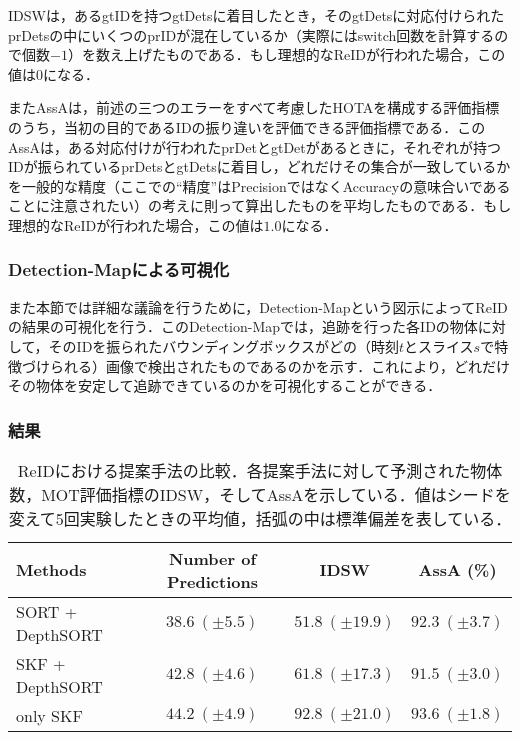         IDSW\cite{luiten2021hota}は，あるgtIDを持つgtDetsに着目したとき，そのgtDetsに対応付けられたprDetsの中にいくつのprIDが混在しているか（実際にはswitch回数を計算するので個数$-1$）を数え上げたものである．もし理想的なReIDが行われた場合，この値は$0$になる．
    
        またAssA\cite{luiten2021hota}は，前述の三つのエラーをすべて考慮したHOTAを構成する評価指標のうち，当初の目的であるIDの振り違いを評価できる評価指標である．このAssAは，ある対応付けが行われたprDetとgtDetがあるときに，それぞれが持つIDが振られているprDetsとgtDetsに着目し，どれだけその集合が一致しているかを一般的な精度（ここでの``精度''はPrecisionではなくAccuracyの意味合いであることに注意されたい）の考えに則って算出したものを平均したものである．もし理想的なReIDが行われた場合，この値は$1.0$になる．

        \subsubsection{Detection-Mapによる可視化}

        また本節では詳細な議論を行うために，Detection-Mapという図示によってReIDの結果の可視化を行う．このDetection-Mapでは，追跡を行った各IDの物体に対して，そのIDを振られたバウンディングボックスがどの（時刻$t$とスライス$s$で特徴づけられる）画像で検出されたものであるのかを示す．これにより，どれだけその物体を安定して追跡できているのかを可視化することができる．

        \subsubsection{結果}

        \begin{table}[t]
            \centering
            \caption[ReIDにおける提案手法の比較]{ReIDにおける提案手法の比較．各提案手法に対して予測された物体数，MOT評価指標のIDSW，そしてAssAを示している．値はシードを変えて5回実験したときの平均値，括弧の中は標準偏差を表している．}
            \label{tab:metrics_reidentification}
            \begin{tabular}{l|ccc}
                Methods & Number of Predictions & IDSW & AssA (\%)
                \\\hline \hline
                SORT + DepthSORT & $38.6 ~ (\pm 5.5)$ & $51.8 ~ (\pm 19.9)$ & $92.3 ~ (\pm 3.7)$
                \\ SKF + DepthSORT & $42.8 ~ (\pm 4.6)$ & $61.8 ~ (\pm 17.3)$ & $91.5 ~ (\pm 3.0)$
                \\ only SKF & $44.2 ~ (\pm 4.9)$ & $92.8 ~ (\pm 21.0)$ & $93.6 ~ (\pm 1.8)$
            \end{tabular}
        \end{table}

